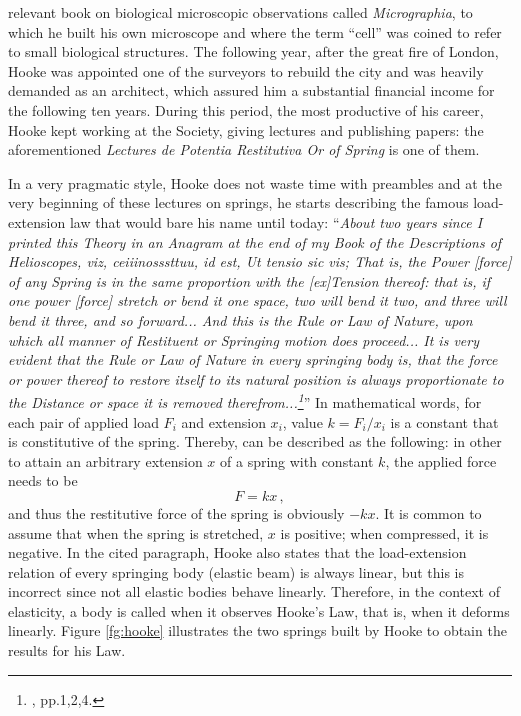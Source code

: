 relevant book on biological microscopic observations called \emph{Micrographia}, to which he built his own microscope and where the term ``cell'' was coined to refer to small biological structures. The following year, after the great fire of London, Hooke was appointed one of the surveyors to rebuild the city and was heavily demanded as an architect, which assured him a substantial financial income for the following ten years. During this period, the most productive of his career, Hooke kept working at the Society, giving lectures and publishing papers: the aforementioned \emph{Lectures \emph{de Potentia Restitutiva} Or of Spring} is one of them. 


In a very pragmatic style, Hooke does not waste time with preambles and at the very beginning of these lectures on springs, he starts describing the famous load-extension law that would bare his name until today: ``\emph{About two years since I printed this Theory in an Anagram at the end of my Book of the Descriptions of Helioscopes, \emph{viz, ceiiinosssttuu, id est, Ut tensio sic vis}; That is, the Power [force] of any Spring is in the same proportion with the [ex]Tension thereof: that is, if one power [force] stretch or bend it one space, two will bend it two, and three will bend it three, and so forward... And this is the Rule or Law of Nature, upon which all manner of Restituent or Springing motion does proceed... It is very evident that the Rule or Law of Nature in every springing body is, that the force or power thereof to restore itself to its natural position is always proportionate to the Distance or space it is removed therefrom...\footnote{\cite{hooke_1678_1}, pp.1,2,4.}}'' In mathematical words, for each pair of applied load $F_i$ and extension $x_i$, value $k=F_i/x_i$ is a constant that is constitutive of the spring. Thereby,  can be described as the following: in other to attain an arbitrary extension $x$ of a spring with constant $k$, the applied force needs to be 
\begin{equation}
F=kx\,,
\end{equation}
and thus the restitutive force of the spring is obviously $-kx$. It is common to assume that when the spring is stretched, $x$ is positive; when compressed, it is negative. In the cited paragraph, Hooke also states that the load-extension relation of every springing body (elastic beam) is always linear, but this is incorrect since not all elastic bodies behave linearly. Therefore, in the context of elasticity, a body is called  when it observes Hooke's Law, that is, when it deforms linearly. Figure \ref{fg:hooke} illustrates the two springs built by Hooke to obtain the results for his Law.  
